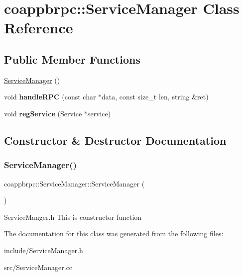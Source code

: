 \hypertarget{classcoappbrpc_1_1ServiceManager}{}\section{coappbrpc\+:\+:Service\+Manager Class Reference}
\label{classcoappbrpc_1_1ServiceManager}
\subsection*{Public Member Functions}
\begin{DoxyCompactItemize}
\item 
\hyperlink{classcoappbrpc_1_1ServiceManager_a7d88663a8d839cf80c3e4942346fa48f}{Service\+Manager} ()
\item 
\mbox{\label{classcoappbrpc_1_1ServiceManager_a13dd031e5d5f6f22af9cbead44ed1db1}} 
void {\bfseries handle\+R\+PC} (const char $\ast$data, const size\+\_\+t len, string \&ret)
\item 
\mbox{\label{classcoappbrpc_1_1ServiceManager_ace94f3f9fbbabc2b1ce23d4267bbfa71}} 
void {\bfseries reg\+Service} (Service $\ast$service)
\end{DoxyCompactItemize}


\subsection{Constructor \& Destructor Documentation}
\mbox{\label{classcoappbrpc_1_1ServiceManager_a7d88663a8d839cf80c3e4942346fa48f}} 
\subsubsection{\texorpdfstring{Service\+Manager()}{ServiceManager()}}
{\footnotesize\ttfamily coappbrpc\+::\+Service\+Manager\+::\+Service\+Manager (\begin{DoxyParamCaption}{ }\end{DoxyParamCaption})}

Service\+Manger.\+h This is constructor function 

The documentation for this class was generated from the following files\+:\begin{DoxyCompactItemize}
\item 
include/Service\+Manager.\+h\item 
src/Service\+Manager.\+cc\end{DoxyCompactItemize}

